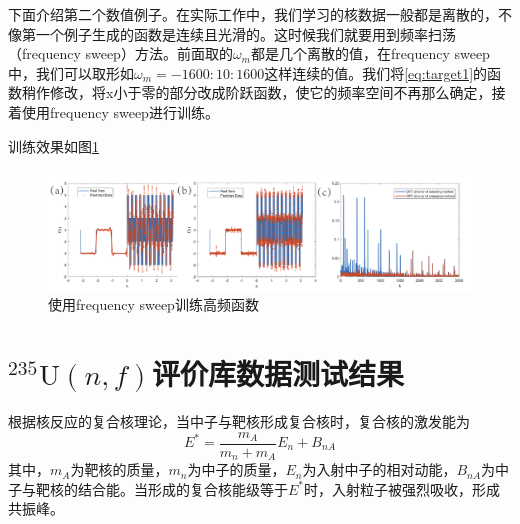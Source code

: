 
下面介绍第二个数值例子。在实际工作中，我们学习的核数据一般都是离散的，不像第一个例子生成的函数是连续且光滑的。这时候我们就要用到频率扫荡（frequency sweep）方法。前面取的$\omega _m$都是几个离散的值，在frequency sweep中，我们可以取形如$\omega _m=-1600:10:1600$这样连续的值。我们将\ref{eq:target1}的函数稍作修改，将x小于零的部分改成阶跃函数，使它的频率空间不再那么确定，接着使用frequency sweep进行训练。

训练效果如图\ref{sweep}
\begin{figure}[htbp!]
  \centering
  \includegraphics[width=0.84\linewidth]{figures/PPSDNN/1D-square.pdf}
  \caption{使用frequency sweep训练高频函数}
  \label{sweep}
\end{figure}


\section{$^{235}\text{U}(n,f)$评价库数据测试结果}
根据核反应的复合核理论，当中子与靶核形成复合核时，复合核的激发能为
\begin{equation}\label{}
  E^{\ast } = \frac{m_A}{m_n+m_A}E_n+B_{nA}
\end{equation}
其中，$m_A$为靶核的质量，$m_n$为中子的质量，$E_n$为入射中子的相对动能，$B_{nA}$为中子与靶核的结合能。当形成的复合核能级等于$E^{\ast }$时，入射粒子被强烈吸收，形成共振峰。


